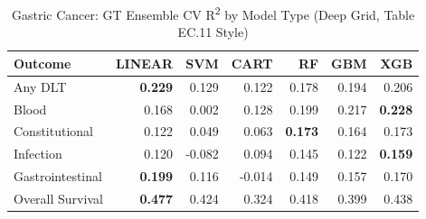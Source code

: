 \begin{table}[ht]
\centering
\caption{Gastric Cancer: GT Ensemble CV R\textsuperscript{2} by Model Type (Deep Grid, Table EC.11 Style)}
\begin{tabular}{lrrrrrr}
\toprule
Outcome & LINEAR & SVM & CART & RF & GBM & XGB \\
\midrule
Any DLT & \textbf{0.229} & 0.129 & 0.122 & 0.178 & 0.194 & 0.206 \\
Blood & 0.168 & 0.002 & 0.128 & 0.199 & 0.217 & \textbf{0.228} \\
Constitutional & 0.122 & 0.049 & 0.063 & \textbf{0.173} & 0.164 & 0.173 \\
Infection & 0.120 & -0.082 & 0.094 & 0.145 & 0.122 & \textbf{0.159} \\
Gastrointestinal & \textbf{0.199} & 0.116 & -0.014 & 0.149 & 0.157 & 0.170 \\
Overall Survival & \textbf{0.477} & 0.424 & 0.324 & 0.418 & 0.399 & 0.438 \\
\bottomrule
\end{tabular}
\end{table}